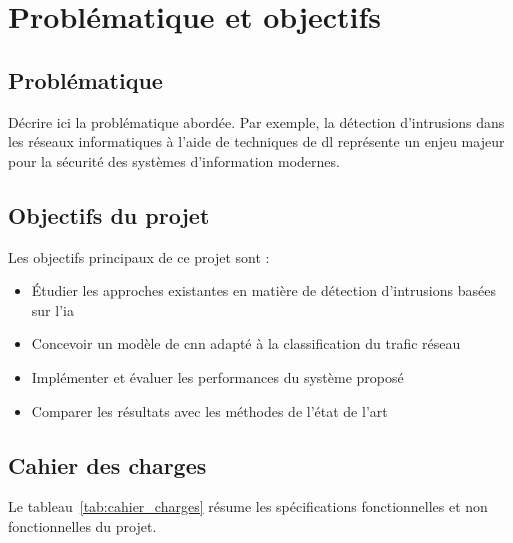 \section{Problématique et objectifs}
\label{sec:problematique}

\subsection{Problématique}

\hspace{1cm}Décrire ici la problématique abordée. Par exemple, la détection d'intrusions dans les réseaux informatiques à l'aide de techniques de \gls{dl} représente un enjeu majeur pour la sécurité des systèmes d'information modernes.


\subsection{Objectifs du projet}

Les objectifs principaux de ce projet sont :

\begin{itemize}
  \item Étudier les approches existantes en matière de détection d'intrusions basées sur l'\gls{ia}
  \item Concevoir un modèle de \gls{cnn} adapté à la classification du trafic réseau
  \item Implémenter et évaluer les performances du système proposé
  \item Comparer les résultats avec les méthodes de l'état de l'art
\end{itemize}

\subsection{Cahier des charges}

Le tableau~\ref{tab:cahier_charges} résume les spécifications fonctionnelles et non fonctionnelles du projet.

